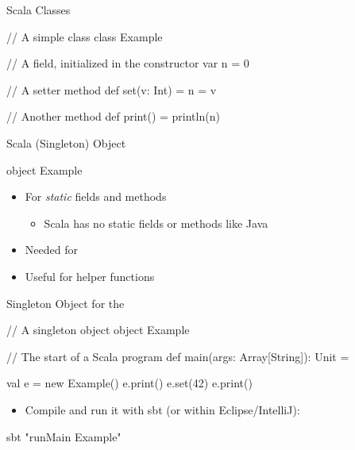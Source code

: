 \begin{frame}[fragile]{Scala Classes}
\begin{chisel}
// A simple class
class Example {
  // A field, initialized in the constructor
  var n = 0
  
  // A setter method
  def set(v: Int) = {
    n = v
  }
  
  // Another method
  def print() = {
    println(n)
  }
}
\end{chisel}
\end{frame}

\begin{frame}[fragile]{Scala (Singleton) Object}
\begin{chisel}
object Example {}
\end{chisel}
\begin{itemize}
\item For \emph{static} fields and methods
\begin{itemize}
\item Scala has no static fields or methods like Java
\end{itemize}
\item Needed for 
\item Useful for helper functions
\end{itemize}
\end{frame}

\begin{frame}[fragile]{Singleton Object for the }
\begin{chisel}
// A singleton object
object Example {
  
  // The start of a Scala program
  def main(args: Array[String]): Unit = {
    
    val e = new Example()
    e.print()
    e.set(42)
    e.print()
  }
}
\end{chisel}
\begin{itemize}
\item Compile and run it with sbt (or within Eclipse/IntelliJ):
\end{itemize}
\begin{chisel}
sbt "runMain Example"
\end{chisel}
\end{frame}







